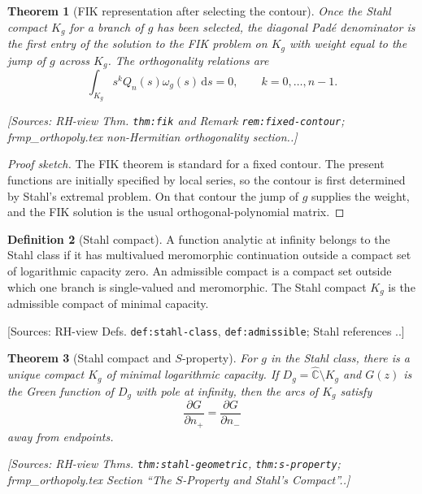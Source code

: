 \documentclass[11pt]{article}
\newtheorem{theorem}{Theorem}[section]
\theoremstyle{definition}
\newtheorem{definition}[theorem]{Definition}
\newcommand{\C}{\mathbb{C}}
\newcommand{\dd}{\,\mathrm{d}}
\newcommand{\Source}[1]{\par\smallskip\noindent\textup{[Sources: #1.]}}
\begin{document}
\begin{theorem}[FIK representation after selecting the contour]\label{thm:fik}
Once the Stahl compact $K_g$ for a branch of $g$ has been selected,
the diagonal Padé denominator is the first entry of the solution to the FIK problem on $K_g$ with weight equal to the jump of $g$ across $K_g$.
The orthogonality relations are
\begin{equation}\label{eq:fik-orth}
        \int_{K_g}s^kQ_n(s)\omega_g(s)\dd s=0,
        \qquad k=0,\ldots,n-1.
\end{equation}
\Source{RH-view Thm. \texttt{thm:fik} and Remark \texttt{rem:fixed-contour}; frmp\_orthopoly.tex non-Hermitian orthogonality section.}
\end{theorem}

\begin{proof}[Proof sketch]
The FIK theorem is standard for a fixed contour.
The present functions are initially specified by local series,
so the contour is first determined by Stahl's extremal problem.
On that contour the jump of $g$ supplies the weight,
and the FIK solution is the usual orthogonal-polynomial matrix.
\end{proof}

\begin{definition}[Stahl compact]\label{def:stahl}
A function analytic at infinity belongs to the Stahl class if it has multivalued meromorphic continuation outside a compact set of logarithmic capacity zero.
An admissible compact is a compact set outside which one branch is single-valued and meromorphic.
The Stahl compact $K_g$ is the admissible compact of minimal capacity.
\Source{RH-view Defs. \texttt{def:stahl-class}, \texttt{def:admissible}; Stahl references \cite{stahlExtremalDomainsAssociatedWithAnAnalyticFunctionI,stahlExtremalDomainsAssociatedWithAnAnalyticFunctionII,stahlConvergenceOfPadeApproximantsBranchPoints}.}
\end{definition}

\begin{theorem}[Stahl compact and $S$-property]\label{thm:stahl-compact}
For $g$ in the Stahl class,
there is a unique compact $K_g$ of minimal logarithmic capacity.
If $D_g=\widehat{\C}\setminus K_g$ and $G(z)$ is the Green function of $D_g$ with pole at infinity,
then the arcs of $K_g$ satisfy
\begin{equation}\label{eq:s-property-canonical}
        \frac{\partial G}{\partial n_+}
        =
        \frac{\partial G}{\partial n_-}
\end{equation}
away from endpoints.
\Source{RH-view Thms. \texttt{thm:stahl-geometric}, \texttt{thm:s-property}; frmp\_orthopoly.tex Section ``The $S$-Property and Stahl's Compact''.}
\end{theorem}
\end{document}
